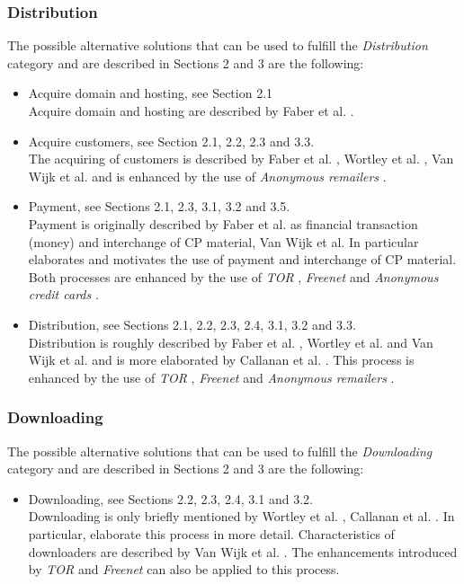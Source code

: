 \documentclass{sig-alternate-br}
\begin{document}
\subsubsection{Distribution}
The possible alternative solutions that can be used to fulfill the \textit{Distribution} category and are described in Sections 2 and 3 are the following:
\begin{itemize}
	\item Acquire domain and hosting, see Section 2.1\\
		Acquire domain and hosting are described by Faber et al. \cite{en2011phishing}.
	\item Acquire customers, see Section 2.1, 2.2, 2.3 and 3.3.\\
		The acquiring of customers is described by Faber et al. \cite{en2011phishing}, Wortley et al. \cite{wortley2006child}, Van Wijk et al. \cite{wijk2009achter} and is enhanced by the use of \textit{Anonymous remailers} \cite{wall2007cybercrime}.
	\item Payment, see Sections 2.1, 2.3, 3.1, 3.2 and 3.5.\\
		Payment is originally described by Faber et al. \cite{en2011phishing} as financial transaction (money) and interchange of CP material, Van Wijk et al. In particular \cite{wijk2009achter} elaborates and motivates the use of payment and interchange of CP material. Both processes are enhanced by the use of \textit{TOR} \cite{dingledine2004tor}, \textit{Freenet} \cite{clarke2001freenet} and \textit{Anonymous credit cards} \cite{wall2007cybercrime}.
	\item Distribution, see Sections 2.1, 2.2, 2.3, 2.4, 3.1, 3.2 and 3.3.\\
		Distribution is roughly described by Faber et al. \cite{en2011phishing}, Wortley et al. \cite{wortley2006child} and Van Wijk et al. \cite{wijk2009achter} and is more elaborated by Callanan et al. \cite{callanan2009internet}. This process is enhanced by the use of \textit{TOR} \cite{dingledine2004tor}, \textit{Freenet} \cite{clarke2001freenet} and \textit{Anonymous remailers} \cite{wall2007cybercrime}.
\end{itemize}

\subsubsection{Downloading}
The possible alternative solutions	 that can be used to fulfill the \textit{Downloading} category and are described in Sections 2 and 3 are the following:
\begin{itemize}
	\item Downloading, see Sections 2.2, 2.3, 2.4, 3.1 and 3.2.\\
		Downloading is only briefly mentioned by Wortley et al. \cite{wortley2006child}, Callanan et al. \cite{callanan2009internet}. In particular, \cite{callanan2009internet} elaborate this process in more detail. Characteristics of downloaders are described by Van Wijk et al. \cite{wijk2009achter}. The enhancements introduced by \textit{TOR} \cite{dingledine2004tor} and \textit{Freenet} \cite{clarke2001freenet} can also be applied to this process.
\end{itemize}
\end{document}
